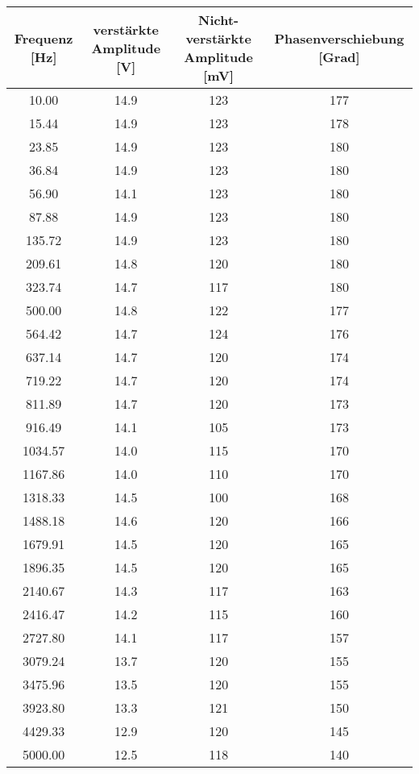 \begin{tabular}{cccc}
    \toprule
    Frequenz [Hz] & verstärkte Amplitude [V] & Nicht-verstärkte Amplitude [mV] & Phasenverschiebung [Grad]\\
    \midrule
    10.00 & 14.9 & 123 & 177 \\
    15.44 & 14.9 & 123 & 178 \\
    23.85 & 14.9 & 123 & 180 \\
    36.84 & 14.9 & 123 & 180 \\
    56.90 & 14.1 & 123 & 180 \\
    87.88 & 14.9 & 123 & 180 \\
    135.72 & 14.9 & 123 & 180 \\
    209.61 & 14.8 & 120 & 180 \\
    323.74 & 14.7 & 117 & 180 \\
    500.00 & 14.8 & 122 & 177 \\
    564.42 & 14.7 & 124 & 176 \\
    637.14 & 14.7 & 120 & 174 \\
    719.22 & 14.7 & 120 & 174 \\
    811.89 & 14.7 & 120 & 173 \\
    916.49 & 14.1 & 105 & 173 \\
    1034.57 & 14.0 & 115 & 170 \\
    1167.86 & 14.0 & 110 & 170 \\
    1318.33 & 14.5 & 100 & 168 \\
    1488.18 & 14.6 & 120 & 166 \\
    1679.91 & 14.5 & 120 & 165 \\
    1896.35 & 14.5 & 120 & 165 \\
    2140.67 & 14.3 & 117 & 163 \\
    2416.47 & 14.2 & 115 & 160 \\
    2727.80 & 14.1 & 117 & 157 \\
    3079.24 & 13.7 & 120 & 155 \\
    3475.96 & 13.5 & 120 & 155 \\
    3923.80 & 13.3 & 121 & 150 \\
    4429.33 & 12.9 & 120 & 145 \\
    5000.00 & 12.5 & 118 & 140 \\
    \bottomrule
\end{tabular}
